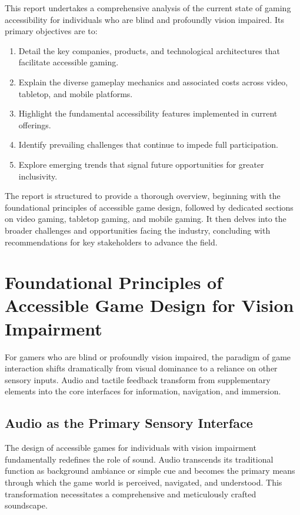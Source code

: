 This report undertakes a comprehensive analysis of the current state of gaming accessibility for individuals who are blind and profoundly vision impaired. Its primary objectives are to:
\begin{enumerate}
    \item Detail the key companies, products, and technological architectures that facilitate accessible gaming.
    \item Explain the diverse gameplay mechanics and associated costs across video, tabletop, and mobile platforms.
    \item Highlight the fundamental accessibility features implemented in current offerings.
    \item Identify prevailing challenges that continue to impede full participation.
    \item Explore emerging trends that signal future opportunities for greater inclusivity.
\end{enumerate}
The report is structured to provide a thorough overview, beginning with the foundational principles of accessible game design, followed by dedicated sections on video gaming, tabletop gaming, and mobile gaming. It then delves into the broader challenges and opportunities facing the industry, concluding with recommendations for key stakeholders to advance the field.

\section{Foundational Principles of Accessible Game Design for Vision Impairment}

For gamers who are blind or profoundly vision impaired, the paradigm of game interaction shifts dramatically from visual dominance to a reliance on other sensory inputs. Audio and tactile feedback transform from supplementary elements into the core interfaces for information, navigation, and immersion.

\subsection{Audio as the Primary Sensory Interface}

The design of accessible games for individuals with vision impairment fundamentally redefines the role of sound. Audio transcends its traditional function as background ambiance or simple cue and becomes the primary means through which the game world is perceived, navigated, and understood. This transformation necessitates a comprehensive and meticulously crafted soundscape.

